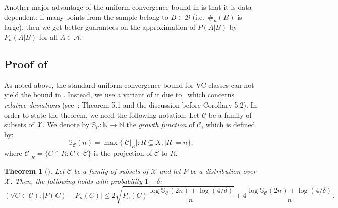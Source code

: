 \documentclass{article}
\def\X{{\mathcal X}}
\newcommand{\cA}{\mathcal{A}}
\newcommand{\cB}{\mathcal{B}}
\newcommand{\cC}{\mathcal{C}}
\newtheorem{theorem}{Theorem}
\begin{document}
Another major advantage of the uniform convergence bound in  is that it is data-dependent: 
if many points from the sample belong to $B\in \cB$ (i.e.\ $\#_n(B)$ is large), 
then we get better guarantees on the approximation of $P(A\vert B)$ by $P_n(A\vert B)$ for all $A\in\cA$.



\subsection{Proof of }

As noted above,
the standard uniform convergence bound for VC classes
can not yield the bound in .
Instead, we use a variant of it due to~\cite{BBL05} which concerns {\it relative deviations}
(see~\cite{BBL05}: Theorem 5.1 and the discussion before Corollary 5.2).
In order to state the theorem, we need the following notation:
Let $\cC$ be a family of subsets of $\X$. We denote by $\mathbb{S}_\cC:\mathbb{N}\to\mathbb{N}$ the {\it growth function} of $\cC$, which is defined by:
\[
\mathbb{S}_\cC(n) = \max\{\lvert \cC|_R\rvert : R\subseteq X, \lvert R\rvert=n\},
\]
where $\cC|_R=\{C\cap R : C\in\cC\}$ is the projection of $\cC$ to $R$.
\begin{theorem}[\cite{BBL05}]\label{thm:ucrel}
Let $\cC$ be a family of subsets of $\X$  and let $P$
be a distribution over $\X$. Then, the following holds with probability $1-\delta$:
\[
(\forall C\in \cC): \lvert P(C)- P_n(C) \rvert \leq  2\sqrt{P_n(C)\frac{\log\mathbb{S}_\cC(2n) + \log(4/\delta)}{n}} + 4\frac{\log\mathbb{S}_\cC(2n) + \log(4/\delta)}{n}. 
\]
\end{theorem}
\end{document}
